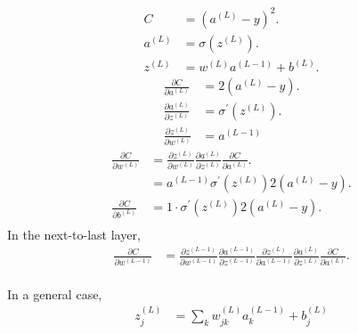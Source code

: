 \begin{align}
C &= (a^{(L)} - y)^2. \\
a^{(L)} &= \sigma(z^{(L)}). \\
z^{(L)} &= w^{(L)} a^{(L - 1)} + b^{(L)}.
\end{align}
\begin{align}
\frac{\partial C}{\partial a^{(L)}} &= 2(a^{(L)} - y). \\
\frac{\partial a^{(L)}}{\partial z^{(L)}} &= \sigma^{\prime} (z^{(L)}). \\
\frac{\partial z^{(L)}}{\partial w^{(L)}} &= a^{(L-1)}
\end{align}
\begin{align}
\frac{\partial C}{\partial w^{(L)}} &= 
\frac{\partial z^{(L)}}{\partial w^{(L)}} 
\frac{\partial a^{(L)}}{\partial z^{(L)}}
\frac{\partial C}{\partial a^{(L)}}. \\
&= a^{(L-1)} \sigma^{\prime} (z^{(L)}) 2(a^{(L)} - y). \\
\frac{\partial C}{\partial b^{(L)}} &= 1 \cdot \sigma^{\prime} (z^{(L)}) 2(a^{(L)} - y). \\
\end{align}
In the next-to-last layer,
\begin{align}
\frac{\partial C}{\partial w^{(L-1)}} &= 
\frac{\partial z^{(L-1)}}{\partial w^{(L-1)}}
\frac{\partial a^{(L-1)}}{\partial z^{(L-1)}}
\frac{\partial z^{(L)}}{\partial a^{(L-1)}} 
\frac{\partial a^{(L)}}{\partial z^{(L)}}
\frac{\partial C}{\partial a^{(L)}}. \\
\end{align}

In a general case,
\begin{align}
z_j^{(L)} &= \sum_k w_{jk}^{(L)} a_k^{(L-1)} + b_j^{(L)}
\end{align}

